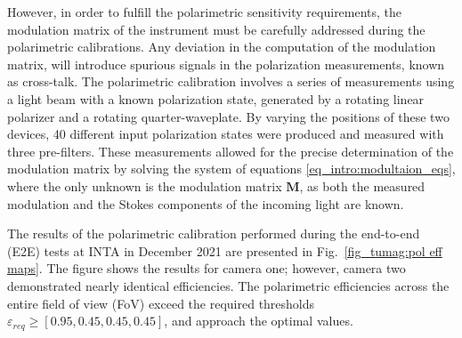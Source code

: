 However, in order to fulfill the polarimetric sensitivity requirements, the modulation matrix of the instrument must be carefully addressed during the polarimetric calibrations. Any deviation in the computation of the modulation matrix, will introduce spurious signals in the polarization measurements, known as cross-talk. The polarimetric calibration involves a series of measurements using a light beam with a known polarization state, generated by a rotating linear polarizer and a rotating quarter-waveplate. By varying the positions of these two devices, 40 different input polarization states were produced and measured with three pre-filters. These measurements allowed for the precise determination of the modulation matrix by solving the system of equations \eqref{eq_intro:modultaion_eqs}, where the only unknown is the modulation matrix $\textbf{M}$, as both the measured modulation and the Stokes components of the incoming light are known.

The results of the polarimetric calibration performed during the end-to-end (E2E) tests at INTA in December 2021 are presented in Fig.~\ref{fig_tumag:pol eff maps}. The figure shows the results for camera one; however, camera two demonstrated nearly identical efficiencies. The polarimetric efficiencies across the entire field of view (FoV) exceed the required thresholds $\varepsilon _{req} \geqslant [0.95, 0.45, 0.45, 0.45]$, and approach the optimal values.




